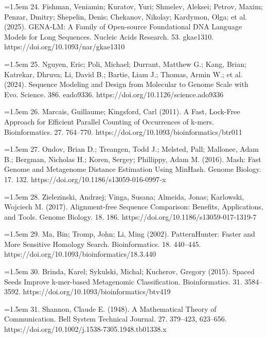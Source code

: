 \documentclass[10.5pt]{article}
\begin{document}
\hangindent=1.5em  24. Fishman, Veniamin; Kuratov, Yuri; Shmelev, Aleksei; Petrov, Maxim; Penzar, Dmitry; Shepelin, Denis; Chekanov, Nikolay; Kardymon, Olga; et al. (2025). GENA-LM: A Family of Open-source Foundational DNA Language Models for Long Sequences. Nucleic Acids Research. 53. gkae1310. https://doi.org/10.1093/nar/gkae1310\par

\hangindent=1.5em  25. Nguyen, Eric; Poli, Michael; Durrant, Matthew G.; Kang, Brian; Katrekar, Dhruva; Li, David B.; Bartie, Liam J.; Thomas, Armin W.; et al. (2024). Sequence Modeling and Design from Molecular to Genome Scale with Evo. Science. 386. eado9336. https://doi.org/10.1126/science.ado9336\par

\hangindent=1.5em  26. Marcais, Guillaume; Kingsford, Carl (2011). A Fast, Lock-Free Approach for Efficient Parallel Counting of Occurrences of k-mers. Bioinformatics. 27. 764--770. https://doi.org/10.1093/bioinformatics/btr011\par

\hangindent=1.5em  27. Ondov, Brian D.; Treangen, Todd J.; Melsted, Pall; Mallonee, Adam B.; Bergman, Nicholas H.; Koren, Sergey; Phillippy, Adam M. (2016). Mash: Fast Genome and Metagenome Distance Estimation Using MinHash. Genome Biology. 17. 132. https://doi.org/10.1186/s13059-016-0997-x\par

\hangindent=1.5em  28. Zielezinski, Andrzej; Vinga, Susana; Almeida, Jonas; Karlowski, Wojciech M. (2017). Alignment-free Sequence Comparison: Benefits, Applications, and Tools. Genome Biology. 18. 186. https://doi.org/10.1186/s13059-017-1319-7\par

\hangindent=1.5em  29. Ma, Bin; Tromp, John; Li, Ming (2002). PatternHunter: Faster and More Sensitive Homology Search. Bioinformatics. 18. 440--445. https://doi.org/10.1093/bioinformatics/18.3.440\par

\hangindent=1.5em  30. Brinda, Karel; Sykulski, Michal; Kucherov, Gregory (2015). Spaced Seeds Improve k-mer-based Metagenomic Classification. Bioinformatics. 31. 3584--3592. https://doi.org/10.1093/bioinformatics/btv419\par

\hangindent=1.5em  31. Shannon, Claude E. (1948). A Mathematical Theory of Communication. Bell System Technical Journal. 27. 379--423, 623--656. https://doi.org/10.1002/j.1538-7305.1948.tb01338.x\par
\end{document}
